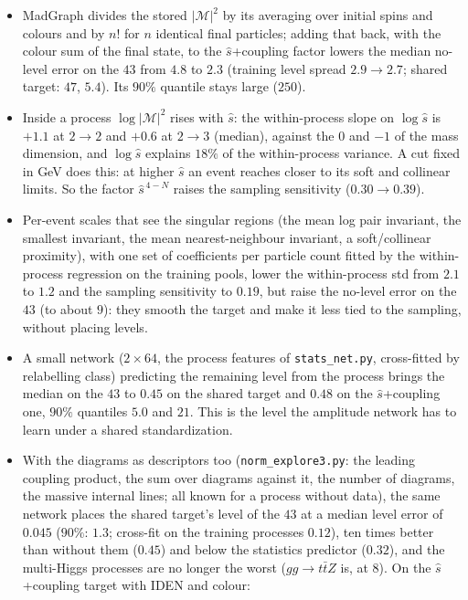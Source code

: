 \documentclass[11pt]{article}
\newcommand{\code}[1]{\texttt{#1}}
\begin{document}
\begin{itemize}
  \item MadGraph divides the stored $|\mathcal M|^2$ by its averaging over initial spins and colours and by $n!$ for
    $n$ identical final particles; adding that back, with the colour sum of the final state, to the $\hat s$+coupling factor lowers the
    median no-level error on the $43$ from $4.8$ to $2.3$ (training level spread $2.9\to2.7$; shared target: $47$, $5.4$). Its
    $90\%$ quantile stays large ($250$).
  \item Inside a process $\log|\mathcal M|^2$ rises with $\hat s$: the within-process slope on $\log\hat s$ is $+1.1$ at
    $2\to2$ and $+0.6$ at $2\to3$ (median), against the $0$ and $-1$ of the mass dimension, and $\log\hat s$ explains
    $18\%$ of the within-process variance. A cut fixed in GeV does this: at higher $\hat s$ an event reaches closer to
    its soft and collinear limits. So the factor $\hat s^{\,4-N}$ raises the sampling sensitivity ($0.30\to0.39$).
  \item Per-event scales that see the singular regions (the mean log pair invariant, the smallest invariant, the mean
    nearest-neighbour invariant, a soft/collinear proximity), with one set of coefficients per particle count fitted
    by the within-process regression on the training pools, lower the within-process std from $2.1$ to $1.2$ and the
    sampling sensitivity to $0.19$, but raise the no-level error on the $43$ (to about $9$): they smooth the target
    and make it less tied to the sampling, without placing levels.
  \item A small network ($2\times64$, the process features of \code{stats\_net.py}, cross-fitted by relabelling class)
    predicting the remaining level from the process brings the median on the $43$ to $0.45$ on the shared target and $0.48$ on the $\hat s$+coupling one,
    $90\%$ quantiles $5.0$ and $21$. This is the level the amplitude network has to learn under a shared
    standardization.
  \item With the diagrams as descriptors too (\code{norm\_explore3.py}: the leading coupling product, the sum over
    diagrams against it, the number of diagrams, the massive internal lines; all known for a process without data),
    the same network places the shared target's level of the $43$ at a median level error of $0.045$ ($90\%$: $1.3$; cross-fit on the
    training processes $0.12$), ten times better than without them ($0.45$) and below the statistics predictor ($0.32$),
    and the multi-Higgs processes are no longer the worst ($gg\to t\bar tZ$ is, at $8$). On the $\hat s$+coupling target with IDEN and colour:

\end{itemize}
\end{document}

